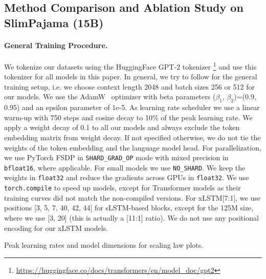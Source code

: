 \documentclass[dvipsnames]{article}
\newcommand{\KP}[1]{\textcolor{blue}{Korbinian: #1}}
\begin{document}
\begin{appendix}
\begin{table}
    \label{tab:lra_test_accuracy}
    
\end{table}


\newpage

\subsection{Method Comparison and Ablation Study on SlimPajama (15B)}

\paragraph{General Training Procedure.}
\label{sec:appGenTrainProc}
We tokenize our datasets using the HuggingFace GPT-2 tokenizer \citep{Radford:19, Brown:20short} \footnote{\url{https://huggingface.co/docs/transformers/en/model\_doc/gpt2}} and use this tokenizer for all models in this paper.
In general, we try to follow \citet{Brown:20short} for the general training setup, i.e. we choose context length 2048 and batch sizes 256 or 512 for our models.
We use the AdamW~\citep{Loshchilov:19} optimizer with beta parameters ($\beta_1$, $\beta_2$)=(0.9, 0.95) and an epsilon parameter of 1e-5.
As learning rate scheduler we use a linear warm-up with 750 steps and cosine decay to 10\% of the peak learning rate. 
We apply a weight decay of 0.1 to all our models and always exclude the token embedding matrix from weight decay.
If not specified otherwise, we do not tie the weights of the token embedding and the language model head.
For parallelization, we use PyTorch FSDP in \texttt{SHARD\_GRAD\_OP} mode with mixed precision in \texttt{bfloat16}, where applicable. 
For small models we use \texttt{NO\_SHARD}.
We keep the weights in \texttt{float32} and reduce the gradients across GPUs in \texttt{float32}.
We use \texttt{torch.compile} to speed up models, except for Transformer models as their training curves did not match the non-compiled versions.
For xLSTM[7:1], we use positions [3, 5, 7, 40, 42, 44] for sLSTM-based blocks, except for the 125M size, where we use [3, 20] (this is actually a [11:1] ratio). 
We do not use any positional encoding for our xLSTM models.


\begin{table}[htbp]
    \centering
    \begin{adjustbox}{width=\textwidth}    
    
    \end{adjustbox}
    \vspace{0.1cm}
    \caption{Peak learning rates and model dimensions for scaling law plots.}
    \label{tab:spaj_peaklr}
\end{table}


\end{appendix}
\end{document}
